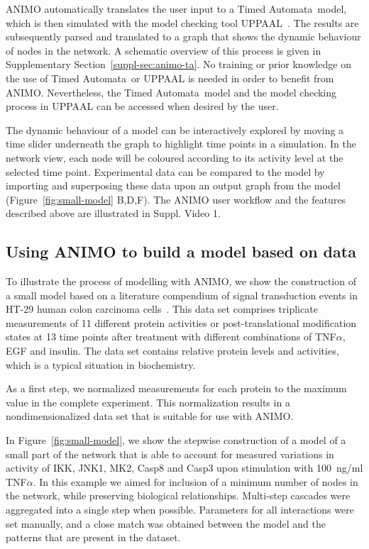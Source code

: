 \documentclass{bmcart}
\def\tas{Timed Automata}
\begin{document}
ANIMO automatically translates the user input to a \tas\ model, which is then simulated with the model 
checking tool UPPAAL~\cite{uppaal}. The results are subsequently parsed and translated to a graph that shows
the dynamic behaviour of nodes in the network. 
A schematic overview of this process is given in Supplementary Section~\ref{suppl-sec:animo-ta}.
No training or prior knowledge on the use of \tas\ or UPPAAL is needed in order to benefit from ANIMO.
Nevertheless, the \tas\ model and the model checking process in UPPAAL can be accessed when desired by the user.

The dynamic behaviour of a model can be interactively explored by
moving a time slider underneath the graph to highlight time points in a simulation. In the network view,
each node will be coloured according to its activity level at the selected time point. 
Experimental data can be compared to the model by importing and superposing these data 
upon an output graph from the model (Figure~\ref{fig:small-model} B,D,F). The ANIMO user workflow and the 
features described above are illustrated in Suppl. Video 1.






\subsection*{Using ANIMO to build a model based on data}\label{subsec:case-study}
To illustrate the process of modelling with ANIMO, we show the construction of a small model based on a 
literature compendium of signal transduction events in HT-29 human colon carcinoma cells~\cite{pathway-compendium}. 
This data set comprises triplicate
measurements of 11 different protein activities or post-translational modification states at 13 time points after
treatment with different combinations of TNF$\alpha$, EGF and insulin.
The data set contains relative protein levels and activities, which is a typical situation in biochemistry.

As a first step, we normalized measurements for each protein to the
maximum value in the complete experiment. This normalization results in a nondimensionalized data set that 
is suitable for use with ANIMO.

In Figure~\ref{fig:small-model}, we show the stepwise construction of a model of a small part of the network that is
able to account for measured variations in activity of IKK, JNK1, MK2, Casp8 and Casp3 upon stimulation with 100~ng/ml TNF$\alpha$.
In this example we aimed for inclusion of a minimum number of nodes in the network, 
while preserving biological relationships.
Multi-step cascades were aggregated into a single step when possible. Parameters for all interactions were 
set manually, and a close match was obtained between the model and the patterns that are present in the dataset.
\end{document}
